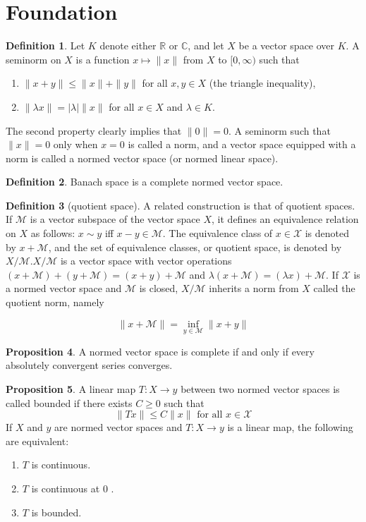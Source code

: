\documentclass[12pt,a4paper]{book}
\newenvironment{enu}{\begin{enumerate}[(1)]}{\end{enumerate}}
\theoremstyle{definition}
\newtheorem{defn}{Definition}[section]
\newtheorem{prop}[defn]{Proposition}
\begin{document}
\section{Foundation}
\begin{defn}
    Let $K$ denote either $\mathbb{R}$ or $\mathbb{C}$, and let $X$ be a vector space over $K$. 
    A seminorm on $X$ is a function $x \mapsto\|x\|$ from $X$ to $[0, \infty)$ such that
\begin{enu}
\item  $\|x+y\| \leq\|x\|+\|y\|$ for all $x, y \in X$ (the triangle inequality),
\item $\|\lambda x\|=|\lambda|\|x\|$ for all $x \in X$ and $\lambda \in K$.
\end{enu}
    The second property clearly implies that $\|0\|=0$. A seminorm such that $\|x\|=0$ only when $x=0$ is called a norm, and a vector space equipped with a norm is called a normed vector space (or normed linear space).
\end{defn}
\begin{defn}
    Banach space is a complete normed vector space.
\end{defn}
\begin{defn}[quotient space]
    A related construction is that of quotient spaces. If $\mathcal{M}$ is a vector subspace of the vector space $X$, it defines an equivalence relation on $X$ as follows: $x \sim y$ iff $x-y \in \mathcal{M}$. The equivalence class of $x \in \mathcal{X}$ is denoted by $x+\mathcal{M}$, and the set of equivalence classes, or quotient space, is denoted by $X / \mathcal{M} . X / \mathcal{M}$ is a vector space with vector operations $(x+\mathcal{M})+(y+\mathcal{M})=(x+y)+\mathcal{M}$ and $\lambda(x+\mathcal{M})=(\lambda x)+\mathcal{M}$. If $\mathcal{X}$ is a normed vector space and $\mathcal{M}$ is closed, $X / \mathcal{M}$ inherits a norm from $X$ called the quotient norm, namely

    $$
    \|x+\mathcal{M}\|=\inf _{y \in \mathcal{M}}\|x+y\|
    $$    
\end{defn}
\begin{prop}
    A normed vector space is complete if and only if every  absolutely convergent series converges.
\end{prop}
\begin{prop}
    A linear map $T: X \rightarrow y$ between two normed vector spaces is called bounded if there exists $C \geq 0$ such that
    $$
    \|T x\| \leq C\|x\| \text { for all } x \in \mathcal{X}
    $$  
    If $X$ and $y$ are normed vector spaces and $T: X \rightarrow y$ is a linear map, the following are equivalent:
\begin{enu} 
    \item $T$ is continuous.
    \item $T$ is continuous at 0 .
    \item $T$ is bounded.
\end{enu}
\end{prop}
\end{document}
